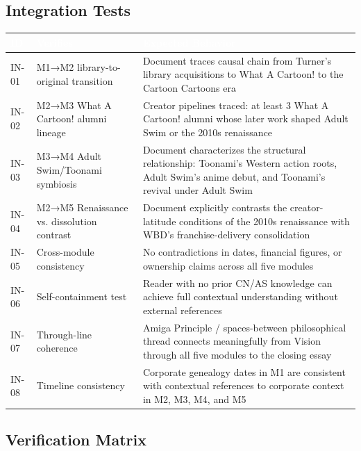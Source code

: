 \documentclass[11pt,letterpaper]{article}
\newcommand{\tableheader}[1]{\textbf{\sffamily\textcolor{white}{#1}}}
\begin{document}
\subsection{Integration Tests}

\begin{center}
\begin{tabularx}{\textwidth}{C{1.5cm}L{5cm}X}
\toprule
{}
\tableheader{ID} & \tableheader{Verifies} & \tableheader{Expected Behavior} \\
\midrule
IN-01 & M1→M2 library-to-original transition & Document traces causal chain from Turner's library acquisitions to What A Cartoon! to the Cartoon Cartoons era \\
IN-02 & M2→M3 What A Cartoon! alumni lineage & Creator pipelines traced: at least 3 What A Cartoon! alumni whose later work shaped Adult Swim or the 2010s renaissance \\
IN-03 & M3→M4 Adult Swim/Toonami symbiosis & Document characterizes the structural relationship: Toonami's Western action roots, Adult Swim's anime debut, and Toonami's revival under Adult Swim \\
IN-04 & M2→M5 Renaissance vs. dissolution contrast & Document explicitly contrasts the creator-latitude conditions of the 2010s renaissance with WBD's franchise-delivery consolidation \\
IN-05 & Cross-module consistency & No contradictions in dates, financial figures, or ownership claims across all five modules \\
IN-06 & Self-containment test & Reader with no prior CN/AS knowledge can achieve full contextual understanding without external references \\
IN-07 & Through-line coherence & Amiga Principle / spaces-between philosophical thread connects meaningfully from Vision through all five modules to the closing essay \\
IN-08 & Timeline consistency & Corporate genealogy dates in M1 are consistent with contextual references to corporate context in M2, M3, M4, and M5 \\
\bottomrule
\end{tabularx}
\end{center}

\subsection{Verification Matrix}
\end{document}
